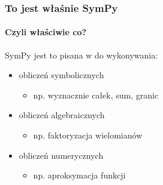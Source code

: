 \documentclass{beamer}
\begin{document}
\begin{frame}
    \frametitle{To jest właśnie SymPy}
    \framesubtitle{Czyli właściwie co?}

    SymPy jest to  pisana w  do wykonywania:
    \begin{itemize}
        \pause
        \item obliczeń symbolicznych
            \begin{itemize}
                \item np. wyznacznie całek, sum, granic
            \end{itemize}
        \pause
        \item obliczeń algebraicznych
            \begin{itemize}
                \item np. faktoryzacja wielomianów
            \end{itemize}
        \pause
        \item obliczeń numerycznych
            \begin{itemize}
                \item np. aproksymacja funkcji
            \end{itemize}
    \end{itemize}
\end{frame}
\end{document}
